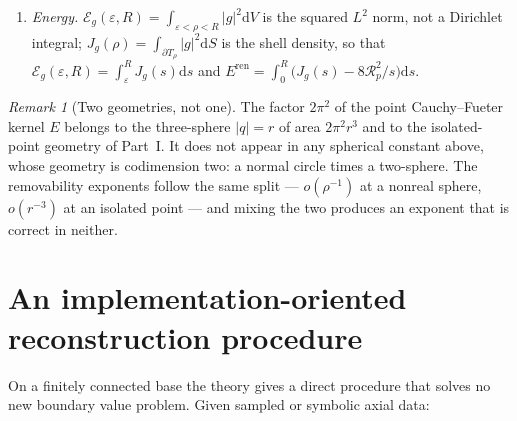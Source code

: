 \documentclass[11pt,a4paper]{article}
\numberwithin{equation}{section}
\theoremstyle{definition}
\theoremstyle{remark}
\newtheorem{remark}[theorem]{Remark}
\theoremstyle{plain}
\newcommand{\SSS}{\mathbb S}
\newcommand{\Rp}{\mathcal R_{p}}      %
\newcommand{\Eg}{\mathcal E_{g}}
\newcommand{\Jg}{J_{g}}
\newcommand{\Eren}{E^{\mathrm{ren}}}
\newcommand{\Tube}{T}
\newcommand{\abs}[1]{\lvert #1\rvert}
\newcommand{\dd}{\mathrm d}
\begin{document}
\begin{enumerate}[label=\textup{(A\arabic*)}]
$2/v$ in the source density $\sigma_p(s)=\frac2v(sa+b)$ (from
\eqref{f:eq:mode-defect} and $\dd S=v^2\dd\sigma$);
$8\pi v$ and $8\pi v^3$ in the two fluxes $\Phi_0=8\pi v(ua+b)$ and
$\Phi_1=-8\pi v^3a$ (from $\int_\SSS\dd\sigma=4\pi$ and the meridian
integral $2\pi$); the $8$ in
$\rho\Jg(\rho)\to8\Rp(a,b)^2$, which is $(2\pi)(4\pi)/\pi^2$; and the
$16\pi^2k$ in the higher-order energy scale.
\item \emph{Energy.} $\Eg(\varepsilon,R)=\int_{\varepsilon<\rho<R}
\abs g^2\dd V$ is the squared $L^2$ norm, not a Dirichlet integral;
$\Jg(\rho)=\int_{\partial \Tube_\rho}\abs g^2\dd S$ is the shell density,
so that $\Eg(\varepsilon,R)=\int_\varepsilon^R\Jg(s)\dd s$ and
$\Eren=\int_0^R\bigl(\Jg(s)-8\Rp^2/s\bigr)\dd s$.
\end{enumerate}

\begin{remark}[Two geometries, not one]
The factor $2\pi^2$ of the point Cauchy--Fueter kernel $E$ belongs to the
three-sphere $\abs q=r$ of area $2\pi^2r^3$ and to the isolated-point
geometry of Part~I. It does not appear in any spherical constant above,
whose geometry is codimension two: a normal circle times a two-sphere. The
removability exponents follow the same split --- $o(\rho^{-1})$ at a nonreal
sphere, $o(r^{-3})$ at an isolated point --- and mixing the two produces an
exponent that is correct in neither.
\end{remark}

\section{An implementation-oriented reconstruction procedure}
\label{f:app:procedure}

On a finitely connected base the theory gives a direct procedure that
solves no new boundary value problem. Given sampled or symbolic axial data:
\end{document}
